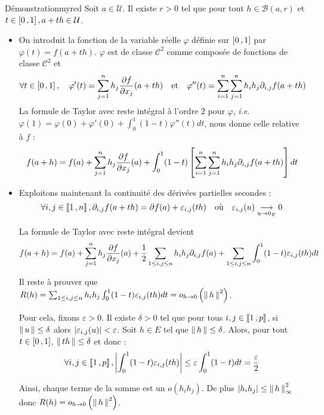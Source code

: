     \begin{demo}{Démonstration}{myred}
        Soit $a \in \mathcal{U}$. Il existe $r > 0$ tel que pour tout $h \in \mathcal{B}(a,r)$ et $t \in \left[ 0 \, , 1 \right], a + th \in \mathcal{U}$. 
        \begin{itemize}
            \item On introduit la fonction de la variable réelle $\varphi$ définie sur $\left[ 0 \, , 1 \right]$ par $\varphi(t) = f(a + th)$. $\varphi$ est de classe $\mathcal{C}^2$ comme composée de fonctions de classe $\mathcal{C}^2$ et 
            \[ \forall t \in \left[ 0 \, , 1 \right], \quad \varphi'(t) = \sum_{j=1}^{n} h_j \frac{\partial f}{\partial x_j}(a + th) \quad \text{et} \quad \varphi''(t) = \sum_{i=1}^{n} \sum_{j=1}^{n} h_i h_j \partial_{i,j} f(a + th) \]   
            La formule de Taylor avec reste intégral à l’ordre $2$ pour $\varphi$, \textit{i.e.} $\varphi(1) = \varphi(0) + \varphi'(0) + \int_{0}^{1} (1-t) \varphi''(t) dt$, nous donne celle relative à $f$ : 
            \[ f(a + h) = f(a) + \sum_{j=1}^{n} h_j \frac{\partial f}{\partial x_j}(a) + \int_{0}^{1} (1-t) \left[\sum_{i=1}^{n} \sum_{j=1}^{n} h_i h_j \partial_{i,j} f (a + t h)\right] dt \]
            \item Exploitons maintenant la continuité des dérivées partielles secondes : 
            \[ \forall i,j \in \left\llbracket 1 \, , n \right\rrbracket, \partial_{i,j}f(a + th) = \partial f(a) + \varepsilon_{i,j}(th) \quad \text{où} \quad \varepsilon_{i,j}(u) \underset{u \rightarrow 0_E}{\longrightarrow} 0 \]   

            La formule de Taylor avec reste intégral devient 
            \[ f(a+h) = f(a) + \sum_{j=1}^{n} h_j \frac{\partial f}{\partial x_j}(a) + \frac{1}{2} \sum_{1 \leq i,j \leq n} h_i h_j \partial_{i,j} f(a) + \sum_{1 \leq i,j \leq n} \int_{0}^{1} (1-t)\varepsilon_{i,j}(th)dt \]    

            Il reste à prouver que $R(h) = \sum_{1 \leq i,j \leq n} h_i h_j \int_{0}^{1} (1-t) \varepsilon_{i,j}(th) dt = o_{h \rightarrow 0} \left(\left\lVert\,h\,\right\rVert^2\right)$. 

            Pour cela, fixons $\varepsilon > 0$. Il existe $\delta > 0$ tel que pour tous $i,j \in \left\llbracket 1 \, , p \right\rrbracket$, si $\left\lVert\,u\,\right\rVert \leq \delta$ alors $\left\lvert \varepsilon_{i,j}(u)\right\rvert < \varepsilon$. Soit $h \in E$ tel que $\left\lVert\,h\,\right\rVert \leq \delta$. Alors, pour tout $t \in \left[ 0 \, , 1 \right]$, $\left\lVert\,th\,\right\rVert \leq \delta$ et donc :
            \[ \forall i,j \in \left\llbracket 1 \, , p \right\rrbracket, \left\lvert \int_{0}^{1} (1-t)\varepsilon_{i,j}(th)\right\rvert \leq \varepsilon \int_{0}^{1} (1-t)dt = \frac{\varepsilon}{2} \]   

            Ainsi, chaque terme de la somme est un $o(h_i h_j)$. De plus $\left\lvert h_i h_j\right\rvert \leq \left\lVert\,h\,\right\rVert^2_{\infty}$ donc $R(h) = o_{h \rightarrow 0} \left(\left\lVert\,h\,\right\rVert^2\right)$.
        \end{itemize}
    \end{demo}


